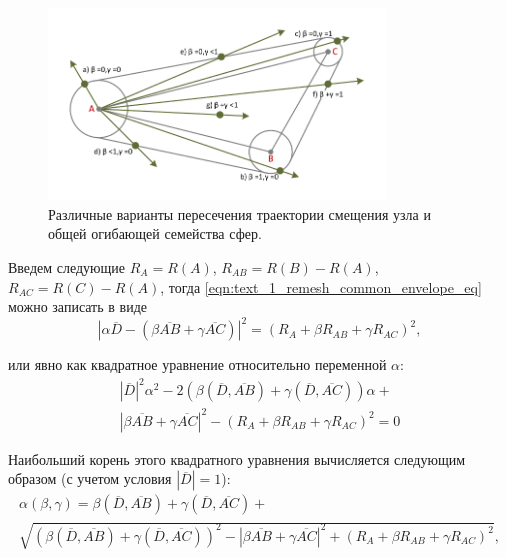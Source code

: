\begin{figure}[ht]
\centering
\includegraphics[width=0.80\textwidth]{./pics/text_1_remesh_common_envelope/triangle2.pdf}
\singlespacing
{}\caption{Различные варианты пересечения траектории смещения узла и общей огибающей семейства сфер.}
\label{fig:text_1_remesh_common_envelope_2}
\end{figure}

Введем следующие $R_A = R(A)$, $R_{AB} = R(B) - R(A)$, $R_{AC} = R(C) - R(A)$, тогда \eqref{eqn:text_1_remesh_common_envelope_eq} можно записать в виде
\begin{equation}
	|\alpha \overline{D} - (\beta \overline{AB} + \gamma \overline{AC})|^2 = (R_A + \beta R_{AB} + \gamma R_{AC})^2,
\end{equation}

или явно как квадратное уравнение относительно переменной $\alpha$:
\begin{multline}
	|\overline{D}|^2 \alpha^2 - 2(\beta (\overline{D}, \overline{AB}) + \gamma (\overline{D}, \overline{AC})) \alpha + \\
	|\beta \overline{AB} + \gamma \overline{AC}|^2 - (R_A + \beta R_{AB} + \gamma R_{AC})^2 = 0
\end{multline}

Наибольший корень этого квадратного уравнения вычисляется следующим образом (с учетом условия $|\overline{D}| = 1$):
\begin{multline}
	\alpha(\beta, \gamma) = \beta (\overline{D}, \overline{AB}) + \gamma (\overline{D}, \overline{AC}) + \\
	\sqrt{(\beta (\overline{D}, \overline{AB}) + \gamma (\overline{D}, \overline{AC}))^2 - |\beta \overline{AB} + \gamma \overline{AC}|^2 + (R_A + \beta R_{AB} + \gamma R_{AC})^2},
\end{multline}

